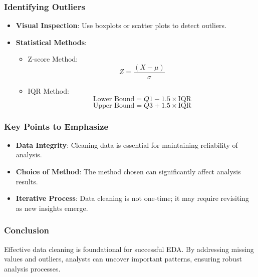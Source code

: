 \documentclass{beamer}
\begin{document}
\begin{frame}
    \frametitle{Identifying Outliers}
    \begin{itemize}
        \item \textbf{Visual Inspection}: Use boxplots or scatter plots to detect outliers.
        \item \textbf{Statistical Methods}:
            \begin{itemize}
                \item Z-score Method:
                    \begin{equation}
                    Z = \frac{(X - \mu)}{\sigma}
                    \end{equation}
                \item IQR Method:
                    \begin{equation}
                    \text{Lower Bound} = Q1 - 1.5 \times \text{IQR}
                    \end{equation}
                    \begin{equation}
                    \text{Upper Bound} = Q3 + 1.5 \times \text{IQR}
                    \end{equation}
            \end{itemize}
    \end{itemize}
\end{frame}

\begin{frame}
    \frametitle{Key Points to Emphasize}
    \begin{itemize}
        \item \textbf{Data Integrity}: Cleaning data is essential for maintaining reliability of analysis.
        \item \textbf{Choice of Method}: The method chosen can significantly affect analysis results.
        \item \textbf{Iterative Process}: Data cleaning is not one-time; it may require revisiting as new insights emerge.
    \end{itemize}
\end{frame}

\begin{frame}
    \frametitle{Conclusion}
    Effective data cleaning is foundational for successful EDA. By addressing missing values and outliers, analysts can uncover important patterns, ensuring robust analysis processes.
\end{frame}
\end{document}
